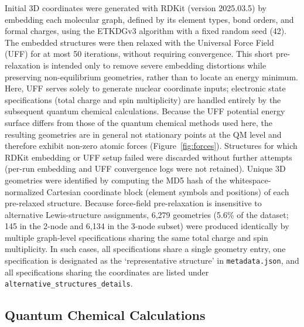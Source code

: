 \documentclass[fleqn,10pt]{article}
\begin{document}
Initial 3D coordinates were generated with RDKit\cite{rdkit} (version 2025.03.5) by embedding each molecular graph, defined by its element types, bond orders, and formal charges, using the ETKDGv3 algorithm with a fixed random seed (42). The embedded structures were then relaxed with the Universal Force Field (UFF)\cite{uff} for at most 50 iterations, without requiring convergence. This short pre-relaxation is intended only to remove severe embedding distortions while preserving non-equilibrium geometries, rather than to locate an energy minimum. Here, UFF serves solely to generate nuclear coordinate inputs; electronic state specifications (total charge and spin multiplicity) are handled entirely by the subsequent quantum chemical calculations. Because the UFF potential energy surface differs from those of the quantum chemical methods used here, the resulting geometries are in general not stationary points at the QM level and therefore exhibit non-zero atomic forces (Figure~\ref{fig:forces}). Structures for which RDKit embedding or UFF setup failed were discarded without further attempts (per-run embedding and UFF convergence logs were not retained). Unique 3D geometries were identified by computing the MD5 hash of the whitespace-normalized Cartesian coordinate block (element symbols and positions) of each pre-relaxed structure. Because force-field pre-relaxation is insensitive to alternative Lewis-structure assignments, 6,279 geometries (5.6\% of the dataset; 145 in the 2-node and 6,134 in the 3-node subset) were produced identically by multiple graph-level specifications sharing the same total charge and spin multiplicity. In such cases, all specifications share a single geometry entry, one specification is designated as the \textquoteleft representative structure\textquoteright{} in \texttt{metadata.json}, and all specifications sharing the coordinates are listed under \texttt{alternative\_structures\_details}.

\subsection*{Quantum Chemical Calculations}
\end{document}
